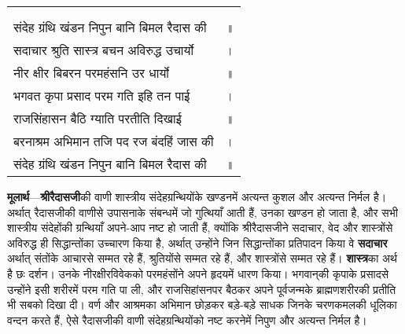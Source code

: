 {
{\bfseries
\setlength{\mylenone}{0pt}
\settowidth{\mylentwo}{}
\setlength{\mylenone}{\maxof{\mylenone}{\mylentwo}}
\settowidth{\mylentwo}{संदेह ग्रंथि खंडन निपुन बानि बिमल रैदास की}
\setlength{\mylenone}{\maxof{\mylenone}{\mylentwo}}
\settowidth{\mylentwo}{सदाचार श्रुति सास्त्र बचन अविरुद्ध उचार्यो}
\setlength{\mylenone}{\maxof{\mylenone}{\mylentwo}}
\settowidth{\mylentwo}{नीर क्षीर बिबरन परमहंसनि उर धार्यो}
\setlength{\mylenone}{\maxof{\mylenone}{\mylentwo}}
\settowidth{\mylentwo}{भगवत कृपा प्रसाद परम गति इहि तन पाई}
\setlength{\mylenone}{\maxof{\mylenone}{\mylentwo}}
\settowidth{\mylentwo}{राजसिंहासन बैठि ग्याति परतीति दिखाई}
\setlength{\mylenone}{\maxof{\mylenone}{\mylentwo}}
\settowidth{\mylentwo}{बरनाश्रम अभिमान तजि पद रज बंदहिं जास की}
\setlength{\mylenone}{\maxof{\mylenone}{\mylentwo}}
\settowidth{\mylentwo}{संदेह ग्रंथि खंडन निपुन बानि बिमल रैदास की}
\setlength{\mylenone}{\maxof{\mylenone}{\mylentwo}}
\setlength{\mylentwo}{\baselineskip}
\setlength{\mylenone}{\mylenone + 1pt}
\begin{longtable}[l]{@{\hspace*{\mylen}}>{\setlength\parfillskip{0pt}}p{\mylenone}@{}@{}l@{}}
 & \\[-\the\mylentwo]
\centering{॥ ५९ \hspace*{-1.5mm}॥} & \\ \nopagebreak
संदेह ग्रंथि खंडन निपुन बानि बिमल रैदास की & ॥\\
सदाचार श्रुति सास्त्र बचन अविरुद्ध उचार्यो & ।\\ \nopagebreak
नीर क्षीर बिबरन परमहंसनि उर धार्यो & ॥\\
भगवत कृपा प्रसाद परम गति इहि तन पाई & ।\\ \nopagebreak
राजसिंहासन बैठि ग्याति परतीति दिखाई & ॥\\
बरनाश्रम अभिमान तजि पद रज बंदहिं जास की & ।\\ \nopagebreak
संदेह ग्रंथि खंडन निपुन बानि बिमल रैदास की & ॥
\end{longtable}
}
}
\begin{sloppypar}\justifying{}
\textbf{मूलार्थ}—\textbf{श्रीरैदासजी}की वाणी शास्त्रीय संदेह\-ग्रन्थियोंके खण्डनमें अत्यन्त कुशल और अत्यन्त निर्मल है। अर्थात् रैदासजीकी वाणीसे उपासनाके संबन्धमें जो गुत्थियाँ आती हैं, उनका खण्डन हो जाता है, और सभी शास्त्रीय संदेहोंकी ग्रन्थियाँ अपने-आप नष्ट हो जाती हैं, क्योंकि श्रीरैदासजीने सदाचार, वेद और शास्त्रोंसे अविरुद्ध ही सिद्धान्तोंका उच्चारण किया है, अर्थात् उन्होंने जिन सिद्धान्तोंका प्रतिपादन किया वे \textbf{सदाचार} अर्थात् संतोंके आचारसे सम्मत रहे हैं, श्रुतियोंसे सम्मत रहे हैं, और शास्त्रोंसे सम्मत रहे हैं। \textbf{शास्त्र}का अर्थ है छः दर्शन। उनके नीर\-क्षीर\-विवेकको परमहंसोंने अपने हृदयमें धारण किया। भगवान्‌की कृपाके प्रसादसे उन्होंने इसी शरीरमें परम गति पा ली, और राज\-सिहांसनपर बैठकर अपने पूर्वजन्मके ब्राह्मण\-शरीरकी प्रतीति भी सबको दिखा दी। वर्ण और आश्रमका अभिमान छोड़कर बड़े-बड़े साधक जिनके चरणकमलकी धूलिका वन्दन करते हैं, ऐसे रैदासजीकी वाणी संदेह\-ग्रन्थियोंको नष्ट करनेमें निपुण और अत्यन्त निर्मल है।
\end{sloppypar}
